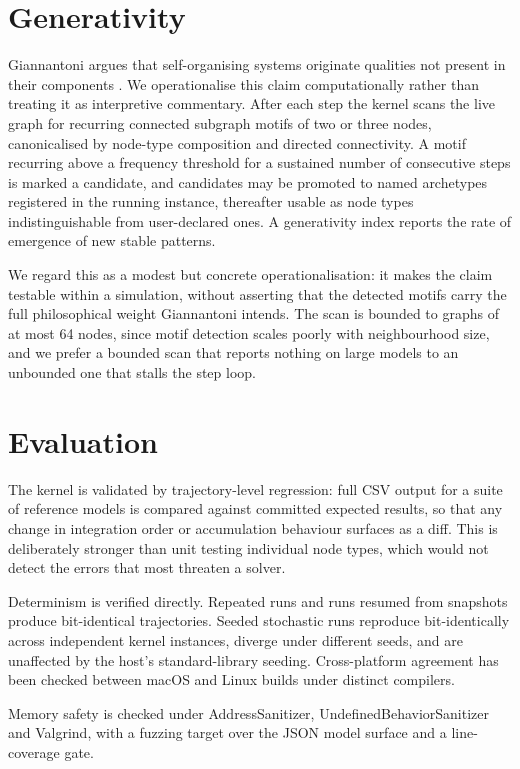 \documentclass[11pt,a4paper]{article}
\begin{document}
\section{Generativity}

Giannantoni argues that self-organising systems originate qualities not present in their components \citep{giannantoni2023}. We operationalise this claim computationally rather than treating it as interpretive commentary. After each step the kernel scans the live graph for recurring connected subgraph motifs of two or three nodes, canonicalised by node-type composition and directed connectivity. A motif recurring above a frequency threshold for a sustained number of consecutive steps is marked a candidate, and candidates may be promoted to named archetypes registered in the running instance, thereafter usable as node types indistinguishable from user-declared ones. A generativity index reports the rate of emergence of new stable patterns.

We regard this as a modest but concrete operationalisation: it makes the claim testable within a simulation, without asserting that the detected motifs carry the full philosophical weight Giannantoni intends. The scan is bounded to graphs of at most 64 nodes, since motif detection scales poorly with neighbourhood size, and we prefer a bounded scan that reports nothing on large models to an unbounded one that stalls the step loop.

\section{Evaluation}

The kernel is validated by trajectory-level regression: full CSV output for a suite of reference models is compared against committed expected results, so that any change in integration order or accumulation behaviour surfaces as a diff. This is deliberately stronger than unit testing individual node types, which would not detect the errors that most threaten a solver.

Determinism is verified directly. Repeated runs and runs resumed from snapshots produce bit-identical trajectories. Seeded stochastic runs reproduce bit-identically across independent kernel instances, diverge under different seeds, and are unaffected by the host's standard-library seeding. Cross-platform agreement has been checked between macOS and Linux builds under distinct compilers.

Memory safety is checked under AddressSanitizer, UndefinedBehaviorSanitizer and Valgrind, with a fuzzing target over the JSON model surface and a line-coverage gate.
\end{document}
